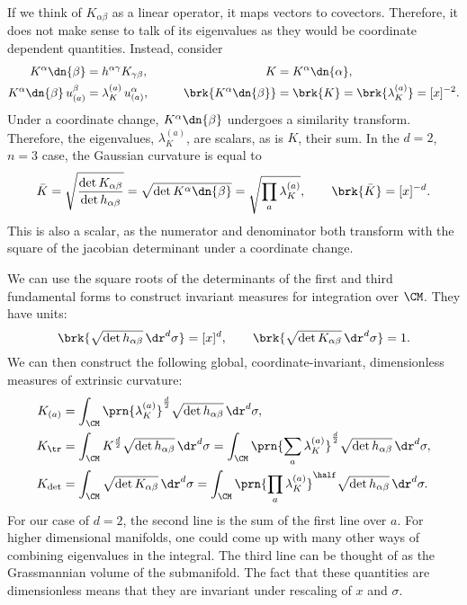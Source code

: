 \documentclass[12pt]{article}
\newcommand{\invsq}{^{-2}}
\begin{document}
If we think of $K_{\alpha\beta}$ as a linear operator, it maps vectors to covectors.
Therefore, it does not make sense to talk of its eigenvalues as they would be coordinate dependent quantities.
Instead, consider
%
\begin{equation}\label{eq:curvop}
\begin{aligned}
  K^\alpha\dn{\beta} &= h^{\alpha\gamma}K_{\gamma\beta},  &
  K &= K^\alpha\dn{\alpha}, \\
  K^\alpha\dn{\beta} \, u^\beta_{(a)} &= \lambda^{(a)}_K \, u^\alpha_{(a)}, \qquad &
  \brk{K^\alpha\dn{\beta}} &= \brk{K} = \brk{\lambda^{(a)}_K} = [x]\invsq.
\end{aligned}
\end{equation}
%
Under a coordinate change, $K^\alpha\dn{\beta}$ undergoes a similarity transform.
Therefore, the eigenvalues, $\lambda^{(a)}_K$, are scalars, as is $K$, their sum.
In the $d=2$, $n=3$ case, the Gaussian curvature is equal to
%
\begin{equation}\label{eq:gausscurv}
  \bar{K} = \sqrt{\frac{\det K_{\alpha\beta}}{\det h_{\alpha\beta}}} = \sqrt{\det K^\alpha\dn{\beta}} = \sqrt{\prod_a \lambda^{(a)}_K},
  \qquad
  \brk{\bar{K}} = [x]^{-d}.
\end{equation}
%
This is also a scalar, as the numerator and denominator both transform with the square of the jacobian determinant under a coordinate change.

We can use the square roots of the determinants of the first and third fundamental forms to construct invariant measures for integration over $\CM$.
They have units:
%
\begin{equation}\label{eq:measure units}
  \brk{\sqrt{\det h_{\alpha\beta}} \, \dr^d \sigma} = [x]^d,
  \qquad
  \brk{\sqrt{\det K_{\alpha\beta}} \, \dr^d \sigma} = 1.
\end{equation}
%
We can then construct the following global, coordinate-invariant, dimensionless measures of extrinsic curvature:
%
\begin{equation}\label{eq:globalextr}
\begin{aligned}
  K_{(a)} &= \int_\CM \prn{\lambda^{(a)}_K}^{\frac{d}{2}} \sqrt{\det h_{\alpha\beta}} \, \dr^d \sigma, \\
  K_{\tr} &= \int_\CM K^{\frac{d}{2}} \sqrt{\det h_{\alpha\beta}} \, \dr^d \sigma
         = \int_\CM \prn{\sum_a \lambda^{(a)}_K}^{\frac{d}{2}} \sqrt{\det h_{\alpha\beta}} \, \dr^d \sigma, \\
  K_{\det} &= \int_\CM \sqrt{\det K_{\alpha\beta}} \, \dr^d \sigma
         = \int_\CM \prn{\prod_a \lambda^{(a)}_K}^{\half} \sqrt{\det h_{\alpha\beta}} \, \dr^d \sigma. \\
\end{aligned}
\end{equation}
%
For our case of $d=2$, the second line is the sum of the first line over $a$.
For higher dimensional manifolds, one could come up with many other ways of combining eigenvalues in the integral.
The third line can be thought of as the Grassmannian volume of the submanifold.
The fact that these quantities are dimensionless means that they are invariant under rescaling of $x$ and $\sigma$.




\end{document}
